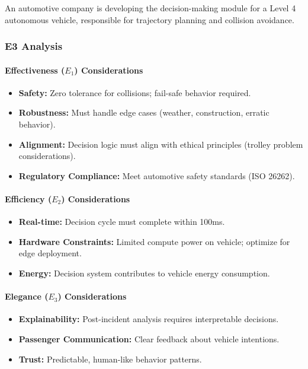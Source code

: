 An automotive company is developing the decision-making module for a Level 4 autonomous vehicle, responsible for trajectory planning and collision avoidance.

\subsubsection{E3 Analysis}

\paragraph{Effectiveness ($E_1$) Considerations}

\begin{itemize}[leftmargin=2em]
    \item \textbf{Safety:} Zero tolerance for collisions; fail-safe behavior required.
    \item \textbf{Robustness:} Must handle edge cases (weather, construction, erratic behavior).
    \item \textbf{Alignment:} Decision logic must align with ethical principles (trolley problem considerations).
    \item \textbf{Regulatory Compliance:} Meet automotive safety standards (ISO 26262).
\end{itemize}

\paragraph{Efficiency ($E_2$) Considerations}

\begin{itemize}[leftmargin=2em]
    \item \textbf{Real-time:} Decision cycle must complete within 100ms.
    \item \textbf{Hardware Constraints:} Limited compute power on vehicle; optimize for edge deployment.
    \item \textbf{Energy:} Decision system contributes to vehicle energy consumption.
\end{itemize}

\paragraph{Elegance ($E_3$) Considerations}

\begin{itemize}[leftmargin=2em]
    \item \textbf{Explainability:} Post-incident analysis requires interpretable decisions.
    \item \textbf{Passenger Communication:} Clear feedback about vehicle intentions.
    \item \textbf{Trust:} Predictable, human-like behavior patterns.
\end{itemize}

